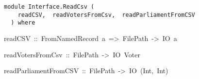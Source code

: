 \label{module:Interface.ReadCsv}
\haddockbeginheader
{\haddockverb\begin{verbatim}
module Interface.ReadCsv (
    readCSV,  readVotersFromCsv,  readParliamentFromCSV
  ) where\end{verbatim}}
\haddockendheader

\begin{haddockdesc}
\item[
readCSV\ ::\ FromNamedRecord\ a\ =>\ FilePath\ ->\ IO\ {\char 91}a{\char 93}
]
\item[
readVotersFromCsv\ ::\ FilePath\ ->\ IO\ {\char 91}Voter{\char 93}
]
\item[
readParliamentFromCSV\ ::\ FilePath\ ->\ IO\ {\char 91}(Int,\ Int){\char 93}
]
\end{haddockdesc}
